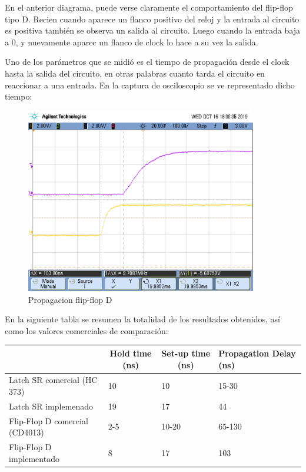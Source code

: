 En el anterior diagrama, puede verse claramente el comportamiento del flip-flop tipo D. Recien cuando aparece un flanco positivo del reloj y la entrada al circuito es positiva también se observa un salida al circuito. Luego cuando la entrada baja a $0$, y nuevamente aparec un flanco de clock lo hace a su vez la salida. 

Uno de los parámetros que se midió es el tiempo de propagación desde el clock hasta la salida del circuito, en otras palabras cuanto tarda el circuito en reaccionar a una entrada. En la captura de osciloscopio se ve representado dicho tiempo:


\begin{figure}[H]
	\centering
	\includegraphics[width=0.9\textwidth]{Ejercicio6/Recursos/propagacion_ffD.png}
	\caption{Propagacion flip-flop D}
\end{figure}


En la siguiente tabla se resumen la totalidad de los resultados obtenidos, as\'i como los valores comerciales de comparaci\'on:

\begin{table}[H]
\centering
\begin{tabular}{llll}\hline
\multicolumn{1}{c}{}           & \multicolumn{1}{c}{Hold time (ns)} & \multicolumn{1}{c}{Set-up time (ns)} & Propagation Delay (ns) \\
\hline
Latch SR comercial (HC 373)    & 10                                 & 10                                   & 15-30                  \\
Latch SR implemenado           & 19                              &   17                                   &  44                \\
Flip-Flop D comercial (CD4013) & 2-5                                & 10-20                                & 65-130                 \\
Flip-Flop D implementado       & 8    &         17                             &             103           \\  \hline
\end{tabular}
\end{table}


